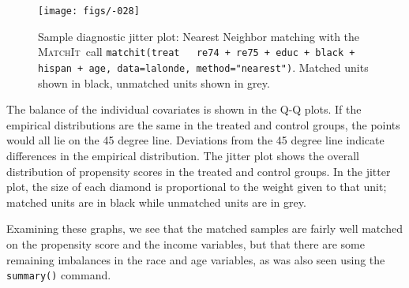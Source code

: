 \documentclass[oneside,letterpaper,titlepage]{article}
\newcommand{\MatchIt}{\textsc{MatchIt}}
\begin{document}
\begin{figure}[tbp]
  \begin{center}
\texttt{[image: figs/-028]}
    \hfill
    \caption{Sample diagnostic jitter plot: Nearest Neighbor matching
      with the \MatchIt\ call \texttt{matchit(treat ~ re74 + re75 +
        educ + black + hispan + age, data=lalonde, method="nearest")}.
      Matched units shown in black, unmatched units shown in grey.}
    \label{diagjitternn}
  \end{center}
\end{figure}

The balance of the individual covariates is shown in the Q-Q plots.
If the empirical distributions are the same in the treated and control
groups, the points would all lie on the 45 degree line.  Deviations
from the 45 degree line indicate differences in the empirical
distribution.  The jitter plot shows the overall distribution of
propensity scores in the treated and control groups.  In the jitter
plot, the size of each diamond is proportional to the weight given to
that unit; matched units are in black while unmatched units are in
grey.

Examining these graphs, we see that the matched samples are fairly
well matched on the propensity score and the income variables, but
that there are some remaining imbalances in the race and age
variables, as was also seen using the \texttt{summary()} command.
\end{document}
